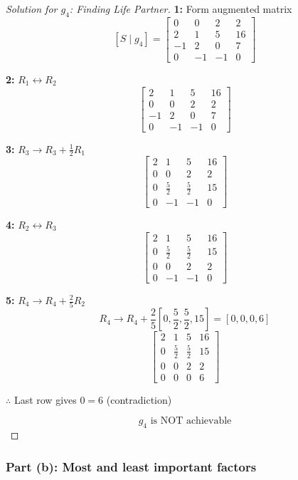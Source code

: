 \documentclass[12pt]{article}
\theoremstyle{definition}
\begin{document}
\begin{proof}[Solution for $g_4$: Finding Life Partner]

\textbf{1:} Form augmented matrix
\[
[S \mid g_4] = \left[\begin{array}{ccc|c}
0 & 0 & 2 & 2 \\
2 & 1 & 5 & 16 \\
-1 & 2 & 0 & 7 \\
0 & -1 & -1 & 0
\end{array}\right]
\]

\textbf{2:} $R_1 \leftrightarrow R_2$
\[
\left[\begin{array}{ccc|c}
2 & 1 & 5 & 16 \\
0 & 0 & 2 & 2 \\
-1 & 2 & 0 & 7 \\
0 & -1 & -1 & 0
\end{array}\right]
\]

\textbf{3:} $R_3 \to R_3 + \frac{1}{2}R_1$
\[
\left[\begin{array}{ccc|c}
2 & 1 & 5 & 16 \\
0 & 0 & 2 & 2 \\
0 & \frac{5}{2} & \frac{5}{2} & 15 \\
0 & -1 & -1 & 0
\end{array}\right]
\]

\textbf{4:} $R_2 \leftrightarrow R_3$
\[
\left[\begin{array}{ccc|c}
2 & 1 & 5 & 16 \\
0 & \frac{5}{2} & \frac{5}{2} & 15 \\
0 & 0 & 2 & 2 \\
0 & -1 & -1 & 0
\end{array}\right]
\]

\textbf{5:} $R_4 \to R_4 + \frac{2}{5}R_2$
\[
R_4 \to R_4 + \frac{2}{5}\left[0, \frac{5}{2}, \frac{5}{2}, 15\right] = \left[0, 0, 0, 6\right]
\]
\[
\left[\begin{array}{ccc|c}
2 & 1 & 5 & 16 \\
0 & \frac{5}{2} & \frac{5}{2} & 15 \\
0 & 0 & 2 & 2 \\
0 & 0 & 0 & 6
\end{array}\right]
\]

$\therefore$ Last row gives $0 = 6$ (contradiction)

\[
\boxed{g_4 \text{ is NOT achievable}}
\]
\end{proof}

\subsubsection*{Part (b): Most and least important factors}
\end{document}
